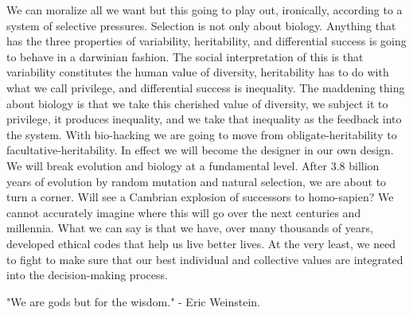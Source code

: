 We can moralize all we want but this going to play out, ironically, according to a system of selective pressures.
Selection is not only about biology.
Anything that has the three properties of variability, heritability, and differential success is going to behave in a darwinian fashion.
The social interpretation of this is that variability constitutes the human value of diversity, heritability has to do with what we call privilege, and differential success is inequality.
The maddening thing about biology is that we take this cherished value of diversity, we subject it to privilege, it produces inequality, and we take that inequality as the feedback into the system.
With bio-hacking we are going to move from obligate-heritability to facultative-heritability.
In effect we will become the designer in our own design.
We will break evolution and biology at a fundamental level.
After 3.8 billion years of evolution by random mutation and natural selection, we are about to turn a corner.
Will see a Cambrian explosion of successors to homo-sapien?
We cannot accurately imagine where this will go over the next centuries and millennia.
What we can say is that we have, over many thousands of years, developed ethical codes that help us live better lives.
At the very least, we need to fight to make sure that our best individual and collective values are integrated into the decision-making process.

\vfill
\hfill "We are gods but for the wisdom." - Eric Weinstein.
